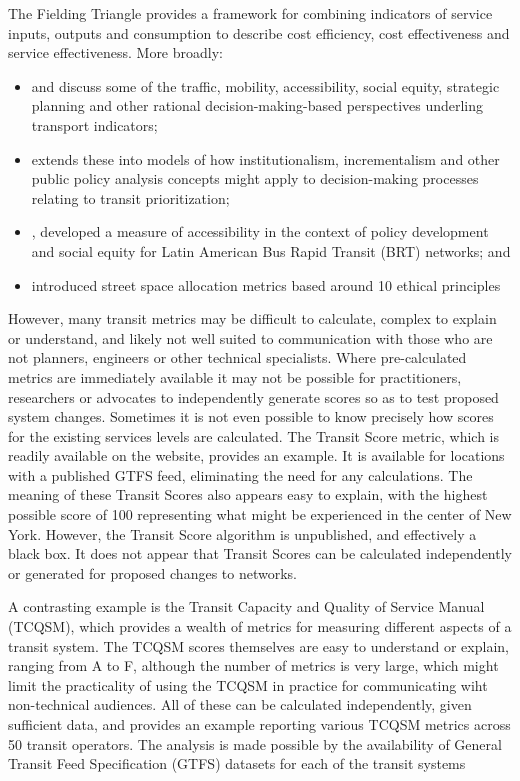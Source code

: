 \documentclass[preprint, 3p,
authoryear]{elsarticle} %
\begin{document}
The Fielding Triangle \citep{FieldingGordonJ1987Mpts} provides a
framework for combining indicators of service inputs, outputs and
consumption to describe cost efficiency, cost effectiveness and service
effectiveness. More broadly:

\begin{itemize}
\item
  \citet{Litman:2003ab} and \citet{Litman:2016aa} discuss some of the
  traffic, mobility, accessibility, social equity, strategic planning
  and other rational decision-making-based perspectives underling
  transport indicators;
\item
  \citet{Reynolds:2017ah} extends these into models of how
  institutionalism, incrementalism and other public policy analysis
  concepts might apply to decision-making processes relating to transit
  prioritization;
\item
  \citet{GuzmanLuisA.2017Aeit}, developed a measure of accessibility in
  the context of policy development and social equity for Latin American
  Bus Rapid Transit (BRT) networks; and
\item
  \citet{Creutzig2020streetspaceallocation} introduced street space
  allocation metrics based around 10 ethical principles
\end{itemize}

However, many transit metrics may be difficult to calculate, complex to
explain or understand, and likely not well suited to communication with
those who are not planners, engineers or other technical specialists.
Where pre-calculated metrics are immediately available it may not be
possible for practitioners, researchers or advocates to independently
generate scores so as to test proposed system changes. Sometimes it is
not even possible to know precisely how scores for the existing services
levels are calculated. The Transit Score metric, which is readily
available on the \citet{WalkScore:2023tg} website, provides an example.
It is available for locations with a published GTFS feed, eliminating
the need for any calculations. The meaning of these Transit Scores also
appears easy to explain, with the highest possible score of 100
representing what might be experienced in the center of New York.
However, the Transit Score algorithm is unpublished, and effectively a
black box. It does not appear that Transit Scores can be calculated
independently or generated for proposed changes to networks.

A contrasting example is the Transit Capacity and Quality of Service
Manual (TCQSM), which provides a wealth of metrics for measuring
different aspects of a transit system. The TCQSM scores themselves are
easy to understand or explain, ranging from A to F, although the number
of metrics is very large, which might limit the practicality of using
the TCQSM in practice for communicating wiht non-technical audiences.
All of these can be calculated independently, given sufficient data, and
\citet{Wong:2013aa} provides an example reporting various TCQSM metrics
across 50 transit operators. The \citet{Wong:2013aa} analysis is made
possible by the availability of General Transit Feed Specification
(GTFS) datasets for each of the transit systems
\end{document}
